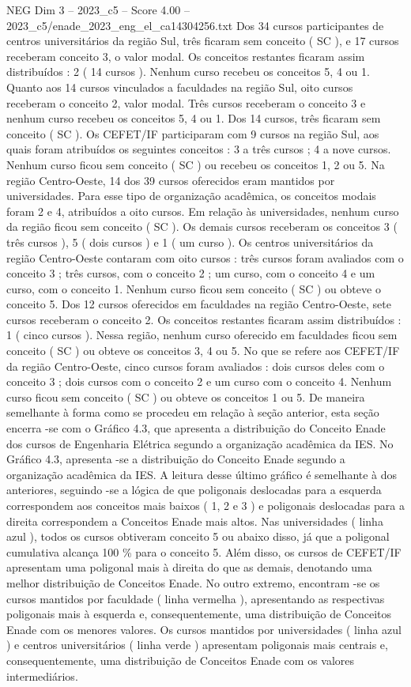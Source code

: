 \begin{textsample}{NEG Dim 3 – 2023\_c5 – Score 4.00 – 2023\_c5/enade\_2023\_eng\_el\_ca14304256.txt}
Dos 34 cursos participantes de centros universitários da região Sul, três ficaram sem conceito ( SC ), e 17 cursos receberam conceito 3, o valor modal.
Os conceitos restantes ficaram assim distribuídos : 2 ( 14 cursos ).
Nenhum curso recebeu os conceitos 5, 4 ou 1.
Quanto aos 14 cursos vinculados a faculdades na região Sul, oito cursos receberam o conceito 2, valor modal.
Três cursos receberam o conceito 3 e nenhum curso recebeu os conceitos 5, 4 ou 1.
Dos 14 cursos, três ficaram sem conceito ( SC ).
Os CEFET/IF participaram com 9 cursos na região Sul, aos quais foram atribuídos os seguintes conceitos : 3 a três cursos ; 4 a nove cursos.
Nenhum curso ficou sem conceito ( SC ) ou recebeu os conceitos 1, 2 ou 5.
Na região Centro-Oeste, 14 dos 39 cursos oferecidos eram mantidos por universidades.
Para esse tipo de organização acadêmica, os conceitos modais foram 2 e 4, atribuídos a oito cursos.
Em relação às universidades, nenhum curso da região ficou sem conceito ( SC ).
Os demais cursos receberam os conceitos 3 ( três cursos ), 5 ( dois cursos ) e 1 ( um curso ).
Os centros universitários da região Centro-Oeste contaram com oito cursos : três cursos foram avaliados com o conceito 3 ; três cursos, com o conceito 2 ; um curso, com o conceito 4 e um curso, com o conceito 1.
Nenhum curso ficou sem conceito ( SC ) ou obteve o conceito 5.
Dos 12 cursos oferecidos em faculdades na região Centro-Oeste, sete cursos receberam o conceito 2.
Os conceitos restantes ficaram assim distribuídos : 1 ( cinco cursos ).
Nessa região, nenhum curso oferecido em faculdades ficou sem conceito ( SC ) ou obteve os conceitos 3, 4 ou 5.
No que se refere aos CEFET/IF da região Centro-Oeste, cinco cursos foram avaliados : dois cursos deles com o conceito 3 ; dois cursos com o conceito 2 e um curso com o conceito 4.
Nenhum curso ficou sem conceito ( SC ) ou obteve os conceitos 1 ou 5.
De maneira semelhante à forma como se procedeu em relação à seção anterior, esta seção encerra -se com o Gráfico 4.3, que apresenta a distribuição do Conceito Enade dos cursos de Engenharia Elétrica segundo a organização acadêmica da IES.
No Gráfico 4.3, apresenta -se a distribuição do Conceito Enade segundo a organização acadêmica da IES.
A leitura desse último gráfico é semelhante à dos anteriores, seguindo -se a lógica de que poligonais deslocadas para a esquerda correspondem aos conceitos mais baixos ( 1, 2 e 3 ) e poligonais deslocadas para a direita correspondem a Conceitos Enade mais altos.
Nas universidades ( linha azul ), todos os cursos obtiveram conceito 5 ou abaixo disso, já que a poligonal cumulativa alcança 100 \% para o conceito 5.
Além disso, os cursos de CEFET/IF apresentam uma poligonal mais à direita do que as demais, denotando uma melhor distribuição de Conceitos Enade.
No outro extremo, encontram -se os cursos mantidos por faculdade ( linha vermelha ), apresentando as respectivas poligonais mais à esquerda e, consequentemente, uma distribuição de Conceitos Enade com os menores valores.
Os cursos mantidos por universidades ( linha azul ) e centros universitários ( linha verde ) apresentam poligonais mais centrais e, consequentemente, uma distribuição de Conceitos Enade com os valores intermediários.

\end{textsample}
